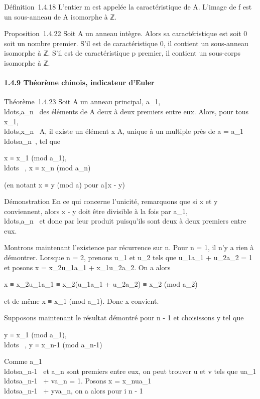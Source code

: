 \documentclass[]{article}
\begin{document}
Définition~1.4.18 L'entier m est appelée la caractéristique de A.
L'image de f est un sous-anneau de A isomorphe à ℤ.

Proposition~1.4.22 Soit A un anneau intègre. Alors sa caractéristique
est soit 0 soit un nombre premier. S'il est de caractéristique 0, il
contient un sous-anneau isomorphe à ℤ. S'il est de caractéristique p
premier, il contient un sous-corps isomorphe à ℤ.

\paragraph{1.4.9 Théorème chinois, indicateur d'Euler}

Théorème~1.4.23 Soit A un anneau principal,
a\_1,\\ldots,a\_n~
des éléments de A deux à deux premiers entre eux. Alors, pour tous
x\_1,\\ldots,x\_n~
\in A, il existe un élément x \in A, unique à un multiple près de a =
a\_1\\ldotsa\_n~,
tel que

x ≡ x\_1
(mod\,\,a\_1),\quad
\\ldots~\quad
, x ≡ x\_n (mod\,\,a\_n)

(en notant x ≡ y (mod\,\,a) pour
a∣x - y)

Démonstration En ce qui concerne l'unicité, remarquons que si x et y
conviennent, alors x - y doit être divisible à la fois par
a\_1,\\ldots,a\_n~
et donc par leur produit puisqu'ils sont deux à deux premiers entre eux.

Montrons maintenant l'existence par récurrence sur n. Pour n = 1, il n'y
a rien à démontrer. Lorsque n = 2, prenons u\_1 et u\_2
tels que u\_1a\_1 + u\_2a\_2 = 1 et
posons x = x\_2u\_1a\_1 +
x\_1u\_2a\_2. On a alors

x ≡ x\_2u\_1a\_1 ≡
x\_2(u\_1a\_1 + u\_2a\_2) ≡
x\_2 (mod\,\,a\_2)

et de même x ≡ x\_1
(mod\,\,a\_1). Donc x convient.

Supposons maintenant le résultat démontré pour n - 1 et choisissons y
tel que

y ≡ x\_1
(mod\,\,a\_1),\quad
\\ldots~\quad
, y ≡ x\_n-1
(mod\,\,a\_n-1)

Comme
a\_1\\ldotsa\_n-1~
et a\_n sont premiers entre eux, on peut trouver u et v tels que
ua\_1\\ldotsa\_n-1~
+ va\_n = 1. Posons x =
x\_nua\_1\\ldotsa\_n-1~
+ yva\_n, on a alors pour i \leq n - 1
\end{document}
